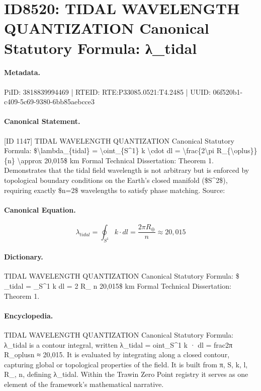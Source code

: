 \section*{ID8520: TIDAL WAVELENGTH QUANTIZATION Canonical Statutory Formula: λ\_tidal}
\paragraph{Metadata.}
PiID: 3818839994469 | RTEID: RTE:P33085.0521:T4.2485 | UUID: 06f520b1-c409-5c69-9380-6bb85aebcce3

\paragraph{Canonical Statement.}
[ID 1147] TIDAL WAVELENGTH QUANTIZATION Canonical Statutory Formula: \$\textbackslash{}lambda\_\{tidal\} = \textbackslash{}oint\_\{S\textasciicircum{}1\} k \textbackslash{}cdot dl = \textbackslash{}frac\{2\textbackslash{}pi R\_\{\textbackslash{}oplus\}\}\{n\} \textbackslash{}approx 20,015\$ km Formal Technical Dissertation: Theorem 1. Demonstrates that the tidal field wavelength is not arbitrary but is enforced by topological boundary conditions on the Earth's closed manifold (\$S\textasciicircum{}2\$), requiring exactly \$n=2\$ wavelengths to satisfy phase matching. Source:

\paragraph{Canonical Equation.}
\[
\lambda_{tidal} = \oint_{S^1} k \cdot dl = \frac{2\pi R_{\oplus}}{n} \approx 20,015
\]

\paragraph{Dictionary.}
TIDAL WAVELENGTH QUANTIZATION Canonical Statutory Formula: \$ \_tidal = \_S\textasciicircum{}1 k dl = 2 R\_ n 20,015\$ km Formal Technical Dissertation: Theorem 1.

\paragraph{Encyclopedia.}
TIDAL WAVELENGTH QUANTIZATION Canonical Statutory Formula: λ\_tidal is a contour integral, written λ\_tidal = oint\_S\textasciicircum{}1 k · dl = frac2π R\_oplusn ≈ 20,015. It is evaluated by integrating along a closed contour, capturing global or topological properties of the field. It is built from π, S, k, l, R\_, n, defining λ\_tidal. Within the Trawin Zero Point registry it serves as one element of the framework's mathematical narrative.
